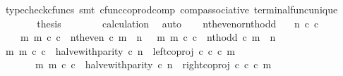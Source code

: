 \begin{isabellebody}
\ {\isacharparenleft}{\kern0pt}typecheck{\isacharunderscore}{\kern0pt}cfuncs{\isacharcomma}{\kern0pt}\ smt\ cfunc{\isacharunderscore}{\kern0pt}coprod{\isacharunderscore}{\kern0pt}comp\ comp{\isacharunderscore}{\kern0pt}associative{}\ terminal{\isacharunderscore}{\kern0pt}func{\isacharunderscore}{\kern0pt}unique{\isacharparenright}{\kern0pt}\isanewline
\ \ \ \ \isamarkupfalse%
\ \isamarkupfalse%
\ {\isacharquery}{\kern0pt}thesis\isanewline
\ \ \ \ \ \ \isamarkupfalse%
\ calculation\ \isamarkupfalse%
\ auto\isanewline
\ \ \isamarkupfalse%
\isanewline
{}\isamarkupfalse%
%
\endisatagproof
{\isafoldproof}%
%
\isadelimproof
\isanewline
%
\endisadelimproof
\isanewline
{}\isamarkupfalse%
\ nth{\isacharunderscore}{\kern0pt}even{\isacharunderscore}{\kern0pt}or{\isacharunderscore}{\kern0pt}nth{\isacharunderscore}{\kern0pt}odd{\isacharcolon}{\kern0pt}\isanewline
\ \ \ {\isachardoublequoteopen}n\ {\isasymin}\isactrlsub c\ {\isasymnat}\isactrlsub c{\isachardoublequoteclose}\isanewline
\ \ \ {\isachardoublequoteopen}{\isacharparenleft}{\kern0pt}{\isasymexists}\ m{\isachardot}{\kern0pt}\ m\ {\isasymin}\isactrlsub c\ {\isasymnat}\isactrlsub c\ {\isasymand}\ nth{\isacharunderscore}{\kern0pt}even\ {\isasymcirc}\isactrlsub c\ m\ {\isacharequal}{\kern0pt}\ n{\isacharparenright}{\kern0pt}\ {\isasymor}\ {\isacharparenleft}{\kern0pt}{\isasymexists}\ m{\isachardot}{\kern0pt}\ m\ {\isasymin}\isactrlsub c\ {\isasymnat}\isactrlsub c\ {\isasymand}\ nth{\isacharunderscore}{\kern0pt}odd\ {\isasymcirc}\isactrlsub c\ m\ {\isacharequal}{\kern0pt}\ n{\isacharparenright}{\kern0pt}{\isachardoublequoteclose}\isanewline
%
\isadelimproof
%
\endisadelimproof
%
\isatagproof
{}\isamarkupfalse%
\ {\isacharminus}{\kern0pt}\isanewline
\ \ \isamarkupfalse%
\ {\isachardoublequoteopen}{\isacharparenleft}{\kern0pt}{\isasymexists}m{\isachardot}{\kern0pt}\ m\ {\isasymin}\isactrlsub c\ {\isasymnat}\isactrlsub c\ {\isasymand}\ halve{\isacharunderscore}{\kern0pt}with{\isacharunderscore}{\kern0pt}parity\ {\isasymcirc}\isactrlsub c\ n\ {\isacharequal}{\kern0pt}\ left{\isacharunderscore}{\kern0pt}coproj\ {\isasymnat}\isactrlsub c\ {\isasymnat}\isactrlsub c\ {\isasymcirc}\isactrlsub c\ m{\isacharparenright}{\kern0pt}\isanewline
\ \ \ \ \ \ {\isasymor}\ {\isacharparenleft}{\kern0pt}{\isasymexists}m{\isachardot}{\kern0pt}\ m\ {\isasymin}\isactrlsub c\ {\isasymnat}\isactrlsub c\ {\isasymand}\ halve{\isacharunderscore}{\kern0pt}with{\isacharunderscore}{\kern0pt}parity\ {\isasymcirc}\isactrlsub c\ n\ {\isacharequal}{\kern0pt}\ right{\isacharunderscore}{\kern0pt}coproj\ {\isasymnat}\isactrlsub c\ {\isasymnat}\isactrlsub c\ {\isasymcirc}\isactrlsub c\ m{\isacharparenright}{\kern0pt}{\isachardoublequoteclose}\isanewline

\end{isabellebody}
